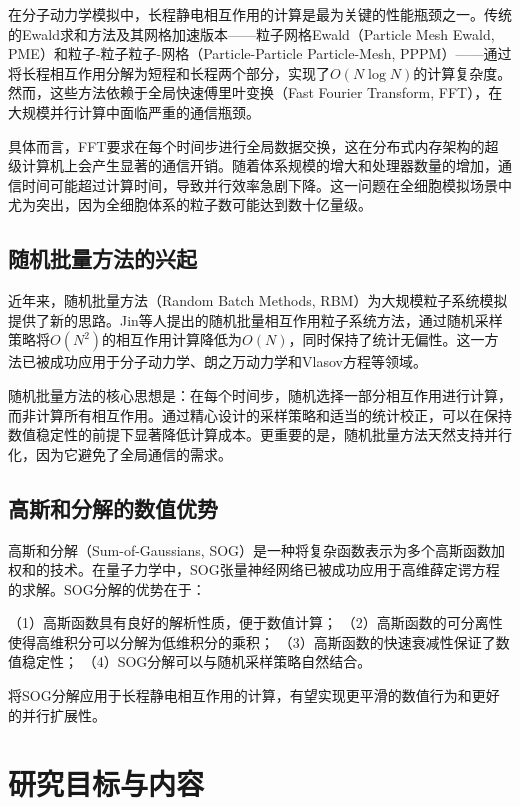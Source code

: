 在分子动力学模拟中，长程静电相互作用的计算是最为关键的性能瓶颈之一。传统的Ewald求和方法及其网格加速版本——粒子网格Ewald（Particle Mesh Ewald, PME）\cite{darden1993particle}和粒子-粒子粒子-网格（Particle-Particle Particle-Mesh, PPPM）\cite{hockney1988computer}——通过将长程相互作用分解为短程和长程两个部分，实现了$O(N\log N)$的计算复杂度。然而，这些方法依赖于全局快速傅里叶变换（Fast Fourier Transform, FFT），在大规模并行计算中面临严重的通信瓶颈。

具体而言，FFT要求在每个时间步进行全局数据交换，这在分布式内存架构的超级计算机上会产生显著的通信开销。随着体系规模的增大和处理器数量的增加，通信时间可能超过计算时间，导致并行效率急剧下降。这一问题在全细胞模拟场景中尤为突出，因为全细胞体系的粒子数可能达到数十亿量级\cite{feig2023current}。

\subsection{随机批量方法的兴起}

近年来，随机批量方法（Random Batch Methods, RBM）为大规模粒子系统模拟提供了新的思路。Jin等人提出的随机批量相互作用粒子系统方法\cite{jin2020random}，通过随机采样策略将$O(N^2)$的相互作用计算降低为$O(N)$，同时保持了统计无偏性。这一方法已被成功应用于分子动力学、朗之万动力学和Vlasov方程等领域。

随机批量方法的核心思想是：在每个时间步，随机选择一部分相互作用进行计算，而非计算所有相互作用。通过精心设计的采样策略和适当的统计校正，可以在保持数值稳定性的前提下显著降低计算成本。更重要的是，随机批量方法天然支持并行化，因为它避免了全局通信的需求\cite{jin2020random}。

\subsection{高斯和分解的数值优势}

高斯和分解（Sum-of-Gaussians, SOG）是一种将复杂函数表示为多个高斯函数加权和的技术。在量子力学中，SOG张量神经网络已被成功应用于高维薛定谔方程的求解\cite{guo2025sum}。SOG分解的优势在于：

（1）高斯函数具有良好的解析性质，便于数值计算；
（2）高斯函数的可分离性使得高维积分可以分解为低维积分的乘积；
（3）高斯函数的快速衰减性保证了数值稳定性；
（4）SOG分解可以与随机采样策略自然结合。

将SOG分解应用于长程静电相互作用的计算，有望实现更平滑的数值行为和更好的并行扩展性。

\section{研究目标与内容}

